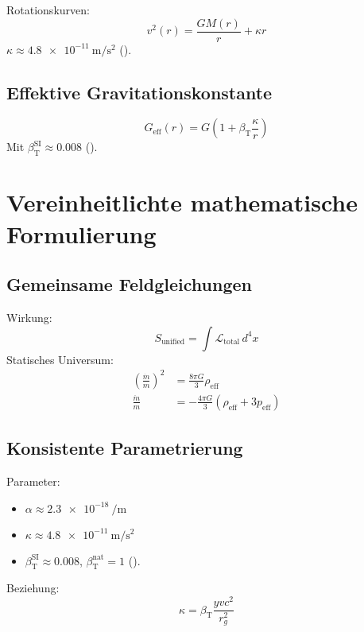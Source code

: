 \documentclass[a4paper,12pt]{article}
\theoremstyle{definition}
\theoremstyle{remark}
\newcommand{\betaT}{\beta_{\text{T}}}
\begin{document}
	Rotationskurven:
	\begin{equation}
		v^2(r) = \frac{G M(r)}{r} + \kappa r
	\end{equation}
	\(\kappa \approx \SI{4.8e-11}{\meter\per\second\squared}\) (\cite{pascher_galaxies_2025}).
	
	\subsection{Effektive Gravitationskonstante}
	
	\begin{equation}
		G_{\text{eff}}(r) = G \left(1 + \betaT \frac{\kappa}{r}\right)
	\end{equation}
	Mit \(\betaT^{\text{SI}} \approx 0.008\) (\cite{pascher_params_2025}).
	
	\section{Vereinheitlichte mathematische Formulierung}
	
	\subsection{Gemeinsame Feldgleichungen}
	
	Wirkung:
	\begin{equation}
		S_\text{unified} = \int \mathcal{L}_\text{total} \, d^4x
	\end{equation}
	Statisches Universum:
	\begin{align}
		\left(\frac{\dot{m}}{m}\right)^2 &= \frac{8\pi G}{3} \rho_{\text{eff}} \\
		\frac{\ddot{m}}{m} &= -\frac{4\pi G}{3} (\rho_{\text{eff}} + 3p_{\text{eff}})
	\end{align}
	
	\subsection{Konsistente Parametrierung}
	
	Parameter:
	\begin{itemize}
		\item \(\alpha \approx \SI{2.3e-18}{\per\meter}\)
		\item \(\kappa \approx \SI{4.8e-11}{\meter\per\second\squared}\)
		\item \(\betaT^{\text{SI}} \approx 0.008\), \(\betaT^{\text{nat}} = 1\) (\cite{pascher_params_2025}).
	\end{itemize}
	Beziehung:
	\begin{equation}
		\kappa = \betaT \frac{y v c^2}{r_g^2}
	\end{equation}
	
\end{document}
